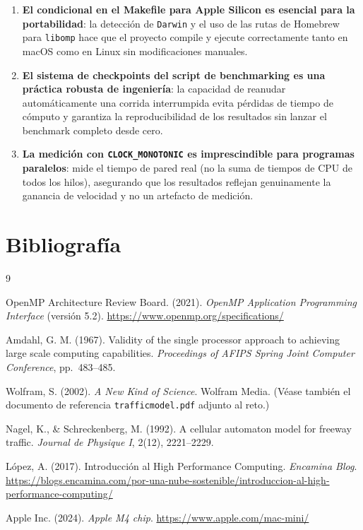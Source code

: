 \documentclass{article}
\begin{document}
\begin{enumerate}
    \item \textbf{El condicional en el Makefile para Apple Silicon es esencial para la
          portabilidad}: la detecci\'on de \texttt{Darwin} y el uso de las rutas de
          Homebrew para \texttt{libomp} hace que el proyecto compile y ejecute correctamente
          tanto en macOS como en Linux sin modificaciones manuales.

    \item \textbf{El sistema de checkpoints del script de benchmarking es una pr\'actica
          robusta de ingenier\'ia}: la capacidad de reanudar autom\'aticamente una corrida
          interrumpida evita p\'erdidas de tiempo de c\'omputo y garantiza la
          reproducibilidad de los resultados sin lanzar el benchmark completo desde cero.

    \item \textbf{La medici\'on con \texttt{CLOCK\_MONOTONIC} es imprescindible para
          programas paralelos}: mide el tiempo de pared real (no la suma de tiempos de
          CPU de todos los hilos), asegurando que los resultados reflejan genuinamente la
          ganancia de velocidad y no un artefacto de medici\'on.

\end{enumerate}

\newpage
\section{Bibliograf\'ia}

\begin{thebibliography}{9}

    OpenMP Architecture Review Board. (2021).
    \textit{OpenMP Application Programming Interface} (versi\'on 5.2).
    \url{https://www.openmp.org/specifications/}

    Amdahl, G. M. (1967).
    Validity of the single processor approach to achieving large scale computing
    capabilities.
    \textit{Proceedings of AFIPS Spring Joint Computer Conference}, pp.\ 483--485.

    Wolfram, S. (2002).
    \textit{A New Kind of Science}.
    Wolfram Media.
    (V\'ease tambi\'en el documento de referencia \texttt{trafficmodel.pdf} adjunto al
    reto.)

    Nagel, K., \& Schreckenberg, M. (1992).
    A cellular automaton model for freeway traffic.
    \textit{Journal de Physique I}, 2(12), 2221--2229.

    L\'opez, A. (2017).
    Introducci\'on al High Performance Computing.
    \textit{Encamina Blog}.
    \url{https://blogs.encamina.com/por-una-nube-sostenible/introduccion-al-high-performance-computing/}

    Apple Inc. (2024).
    \textit{Apple M4 chip}.
    \url{https://www.apple.com/mac-mini/}

\end{thebibliography}
\end{document}
